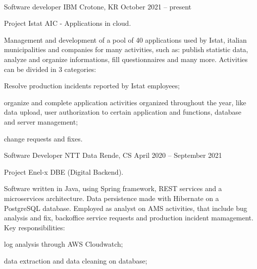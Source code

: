 \documentclass[]{style}
\begin{document}
\begin{center}
	  \\
	\vspace{2mm}
\end{center}

\begin{cventries}
	\cventry
	{Software developer}
	{IBM}
	{Crotone, KR}
	{October 2021 – present}
	{\begin{cventryparagraph}
		\item {Project Istat AIC - Applications in cloud.}
		\item {Management and development of a pool of 40 applications used by Istat, italian municipalities and companies for many activities, such as: publish statistic data, analyze and organize informations, fill questionnaires and many more. Activities can be divided in 3 categories:}
    	{\begin{cventryparagraphlist}
    		\item {Resolve production incidents reported by Istat employees;}
    		\item {organize and complete application activities organized throughout the year, like data upload, user authorization to certain application and functions, database and server management;}
    		\item {change requests and fixes.}
    	\end{cventryparagraphlist}}
	\end{cventryparagraph}}
	\cventry
	{Software Developer}
	{NTT Data}
	{Rende, CS}
	{April 2020 – September 2021}
	{\begin{cventryparagraph}
		\item {Project Enel-x DBE (Digital Backend).}
		\item {Software written in Java, using Spring framework, REST services and a microservices architecture. Data persistence made with Hibernate on a PostgreSQL database. Employed as analyst on AMS activities, that include bug analysis and fix, backoffice service requests and production incident mamagement. Key responsibilities:}
    	{\begin{cventryparagraphlist}
    		\item {log analysis through AWS Cloudwatch;}
    		\item {data extraction and data cleaning on database;}

\end{cventryparagraphlist}}
\end{cventryparagraph}}
\end{cventries}
\end{document}
